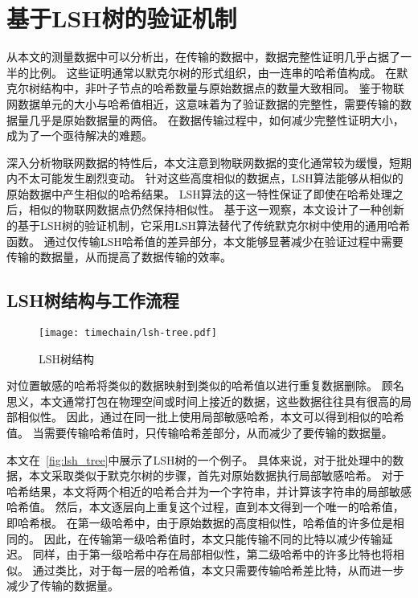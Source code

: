 \chapter{基于LSH树的验证机制}
\label{sec:lsh}
从本文的测量数据中可以分析出，在传输的数据中，数据完整性证明几乎占据了一半的比例。
这些证明通常以默克尔树的形式组织，由一连串的哈希值构成。
在默克尔树结构中，非叶子节点的哈希数量与原始数据点的数量大致相同。
鉴于物联网数据单元的大小与哈希值相近，这意味着为了验证数据的完整性，需要传输的数据量几乎是原始数据量的两倍。
在数据传输过程中，如何减少完整性证明大小，成为了一个亟待解决的难题。

深入分析物联网数据的特性后，本文注意到物联网数据的变化通常较为缓慢，短期内不太可能发生剧烈变动。
针对这些高度相似的数据点，LSH算法能够从相似的原始数据中产生相似的哈希结果。
LSH算法的这一特性保证了即使在哈希处理之后，相似的物联网数据点仍然保持相似性。
基于这一观察，本文设计了一种创新的基于LSH树的验证机制，它采用LSH算法替代了传统默克尔树中使用的通用哈希函数。
通过仅传输LSH哈希值的差异部分，本文能够显著减少在验证过程中需要传输的数据量，从而提高了数据传输的效率。

\section{LSH树结构与工作流程}

\begin{figure}[t]
    \centering
	\begin{minipage}{0.45\linewidth}
        \centering
        \texttt{[image: timechain/lsh-tree.pdf]}
        \caption{LSH树结构}
        \label{fig:lsh_tree}
	\end{minipage}
\end{figure}

对位置敏感的哈希将类似的数据映射到类似的哈希值以进行重复数据删除。
顾名思义，本文通常打包在物理空间或时间上接近的数据，这些数据往往具有很高的局部相似性。
因此，通过在同一批上使用局部敏感哈希，本文可以得到相似的哈希值。
当需要传输哈希值时，只传输哈希差部分，从而减少了要传输的数据量。

本文在~\autoref{fig:lsh_tree}中展示了LSH树的一个例子。
具体来说，对于批处理中的数据，本文采取类似于默克尔树的步骤，首先对原始数据执行局部敏感哈希。
对于哈希结果，本文将两个相近的哈希合并为一个字符串，并计算该字符串的局部敏感哈希值。
然后，本文逐层向上重复这个过程，直到本文得到一个唯一的哈希值，即哈希根。
在第一级哈希中，由于原始数据的高度相似性，哈希值的许多位是相同的。
因此，在传输第一级哈希值时，本文只能传输不同的比特以减少传输延迟。
同样，由于第一级哈希中存在局部相似性，第二级哈希中的许多比特也将相似。
通过类比，对于每一层的哈希值，本文只需要传输哈希差比特，从而进一步减少了传输的数据量。


